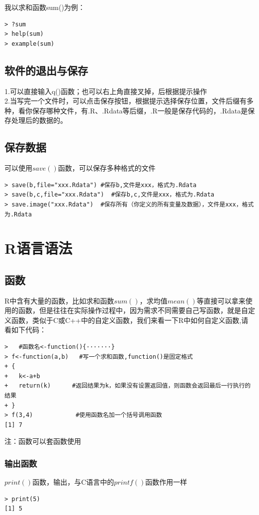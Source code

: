我以求和函数sum()为例：
\begin{lstlisting}
> ?sum
> help(sum)
> example(sum)    
\end{lstlisting}

\subsection{软件的退出与保存}
1.可以直接输入q()函数；也可以右上角直接叉掉，后根据提示操作\\

2.当写完一个文件时，可以点击保存按钮，根据提示选择保存位置，文件后缀有多种，看你保存哪种文件，有.R、.Rdata等后缀，.R一般是保存代码的，.Rdata是保存处理后的数据的。

\subsection{保存数据}
可以使用$save()$函数，可以保存多种格式的文件
\begin{lstlisting}
> save(b,file="xxx.Rdata") #保存b,文件是xxx，格式为.Rdata
> save(b,c,file="xxx.Rdata")  #保存b,c,文件是xxx，格式为.Rdata
> save.image("xxx.Rdata")  #保存所有（你定义的所有变量及数据），文件是xxx，格式为.Rdata    
\end{lstlisting}

\section{R语言语法}
\subsection{函数}
R中含有大量的函数，比如求和函数$sum()$，求均值$mean()$等直接可以拿来使用的函数，但是往往在实际操作过程中，因为需求不同需要自己写函数，就是自定义函数，类似于C或C++中的自定义函数，我们来看一下R中如何自定义函数,请看如下代码：
\begin{lstlisting}
>   #函数名<-function(){·······}
> f<-function(a,b)   #写一个求和函数,function()是固定格式
+ {
+   k<-a+b
+   return(k)      #返回结果为k，如果没有设置返回值，则函数会返回最后一行执行的结果
+ }
> f(3,4)            #使用函数名加一个括号调用函数
[1] 7
\end{lstlisting}
注：函数可以套函数使用

\subsubsection{输出函数}
$print()$函数，输出，与C语言中的$printf()$函数作用一样
\begin{lstlisting}
> print(5)
[1] 5    
\end{lstlisting}


